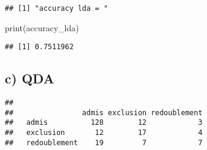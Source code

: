 \documentclass[
]{article}
\newenvironment{Shaded}{\begin{snugshade}}{\end{snugshade}}
\newcommand{\AttributeTok}[1]{\textcolor[rgb]{0.77,0.63,0.00}{#1}}
\newcommand{\CommentTok}[1]{\textcolor[rgb]{0.56,0.35,0.01}{\textit{#1}}}
\newcommand{\DecValTok}[1]{\textcolor[rgb]{0.00,0.00,0.81}{#1}}
\newcommand{\FunctionTok}[1]{\textcolor[rgb]{0.00,0.00,0.00}{#1}}
\newcommand{\NormalTok}[1]{#1}
\newcommand{\OtherTok}[1]{\textcolor[rgb]{0.56,0.35,0.01}{#1}}
\newcommand{\SpecialCharTok}[1]{\textcolor[rgb]{0.00,0.00,0.00}{#1}}
\begin{document}
\begin{verbatim}
## [1] "accuracy lda = "
\end{verbatim}

\begin{Shaded}
\begin{Highlighting}[]
\FunctionTok{print}\NormalTok{(accuracy\_lda)}
\end{Highlighting}
\end{Shaded}

\begin{verbatim}
## [1] 0.7511962
\end{verbatim}

\hypertarget{c-qda}{%
\subsection{c) QDA}\label{c-qda}}

\begin{Shaded}
\end{Shaded}

\begin{verbatim}
##               
##                admis exclusion redoublement
##   admis          128        12            3
##   exclusion       12        17            4
##   redoublement    19         7            7
\end{verbatim}

\begin{Shaded}
\end{Shaded}
\end{document}

